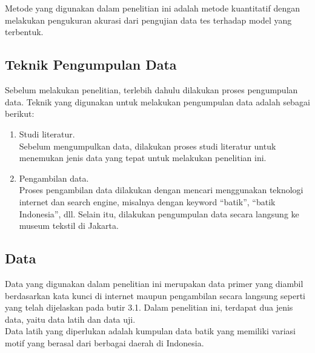 \chapter{\babTiga}
Metode yang digunakan dalam penelitian ini adalah metode kuantitatif dengan melakukan pengukuran akurasi dari pengujian data tes terhadap model yang terbentuk.


\section{Teknik Pengumpulan Data}
Sebelum melakukan penelitian, terlebih dahulu dilakukan proses pengumpulan data. Teknik yang digunakan untuk melakukan pengumpulan data adalah sebagai berikut:
\begin{enumerate}
	\item Studi literatur.\\
Sebelum mengumpulkan data, dilakukan proses studi literatur untuk menemukan jenis data yang tepat untuk melakukan penelitian ini.	
	\item Pengambilan data.\\
Proses pengambilan data dilakukan dengan mencari menggunakan teknologi internet dan search engine, misalnya dengan keyword “batik”, “batik Indonesia”, dll. Selain itu, dilakukan pengumpulan data secara langsung ke museum tekstil di Jakarta.
\end{enumerate}

\section{Data}
Data yang digunakan dalam penelitian ini merupakan data primer yang diambil berdasarkan kata kunci di internet maupun pengambilan secara langsung seperti yang telah dijelaskan pada butir 3.1. Dalam penelitian ini, terdapat dua jenis data, yaitu data latih dan data uji. \\
Data latih yang diperlukan adalah kumpulan data batik yang memiliki variasi motif yang berasal dari berbagai daerah di Indonesia.

